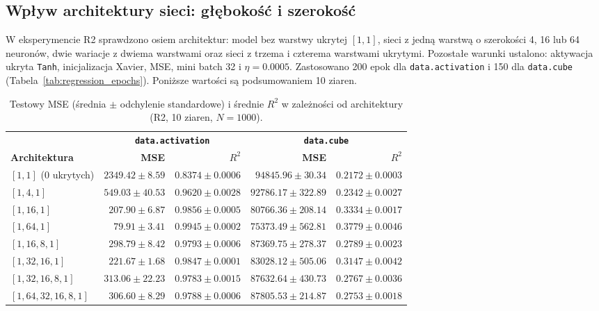 \documentclass[11pt,a4paper]{article}
\begin{document}
\subsection{Wpływ architektury sieci: głębokość i szerokość}
W eksperymencie R2 sprawdzono osiem architektur: model bez warstwy ukrytej $[1,1]$, sieci z jedną warstwą o szerokości 4, 16 lub 64 neuronów, dwie wariacje z dwiema warstwami oraz sieci z trzema i czterema warstwami ukrytymi. Pozostałe warunki ustalono: aktywacja ukryta \texttt{Tanh}, inicjalizacja Xavier, MSE, mini batch 32 i $\eta=0.0005$. Zastosowano 200 epok dla \texttt{data.activation} i 150 dla \texttt{data.cube} (Tabela~\ref{tab:regression_epochs}). Poniższe wartości są podsumowaniem 10 ziaren.

\begin{table}[H]
    \centering
    \small
    \caption{Testowy MSE (średnia $\pm$ odchylenie standardowe) i średnie $R^2$ w zależności od architektury (R2, 10 ziaren, $N=1000$).}
    \label{tab:r2_regression}
    \begin{tabular}{lrrrr}
        \toprule
        & \multicolumn{2}{c}{\textbf{\texttt{data.activation}}} & \multicolumn{2}{c}{\textbf{\texttt{data.cube}}} \\
        \cmidrule(lr){2-3} \cmidrule(lr){4-5}
        \textbf{Architektura} & \textbf{MSE} & \textbf{$R^2$} & \textbf{MSE} & \textbf{$R^2$} \\
        \midrule
        $[1,1]$ (0 ukrytych)             & $2349.42 \pm 8.59$ & $0.8374 \pm 0.0006$ & $94845.96 \pm 30.34$ & $0.2172 \pm 0.0003$ \\
        $[1,4,1]$                         & $549.03 \pm 40.53$ & $0.9620 \pm 0.0028$ & $92786.17 \pm 322.89$ & $0.2342 \pm 0.0027$ \\
        $[1,16,1]$                        & $207.90 \pm 6.87$ & $0.9856 \pm 0.0005$ & $80766.36 \pm 208.14$ & $0.3334 \pm 0.0017$ \\
        $[1,64,1]$                        & $79.91 \pm 3.41$ & $0.9945 \pm 0.0002$ & $75373.49 \pm 562.81$ & $0.3779 \pm 0.0046$ \\
        $[1,16,8,1]$                      & $298.79 \pm 8.42$ & $0.9793 \pm 0.0006$ & $87369.75 \pm 278.37$ & $0.2789 \pm 0.0023$ \\
        $[1,32,16,1]$                     & $221.67 \pm 1.68$ & $0.9847 \pm 0.0001$ & $83028.12 \pm 505.06$ & $0.3147 \pm 0.0042$ \\
        $[1,32,16,8,1]$                   & $313.06 \pm 22.23$ & $0.9783 \pm 0.0015$ & $87632.64 \pm 430.73$ & $0.2767 \pm 0.0036$ \\
        $[1,64,32,16,8,1]$                & $306.60 \pm 8.29$ & $0.9788 \pm 0.0006$ & $87805.53 \pm 214.87$ & $0.2753 \pm 0.0018$ \\
        \bottomrule
    \end{tabular}
\end{table}
\end{document}
